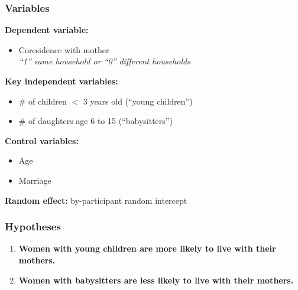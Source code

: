 \documentclass{beamer}
\begin{document}

\begin{frame}

\frametitle{Variables}

\textbf{Dependent variable:} 
\begin{itemize}
	\item Coresidence with mother \\
		\emph{``1'' same household or ``0'' different households}
\end{itemize}

\textbf{Key independent variables:}
\begin{itemize}
	\item \# of children $<$ 3 years old (``young children'')
	\item \# of daughters age 6 to 15 (``babysitters'')
\end{itemize}

\textbf{Control variables:}
\begin{itemize}
	\item Age
	\item Marriage
\end{itemize}

\vspace{0.5cm}
\textbf{Random effect:} by-participant random intercept


\end{frame}


\begin{frame}
\frametitle{Hypotheses}
\begin{enumerate}
\item \textbf{Women with young children are more likely to live with their mothers.}
\vspace{0.5cm}
\item \textbf{Women with babysitters are less likely to live with their mothers.}
\end{enumerate}
\end{frame}

\end{document}
